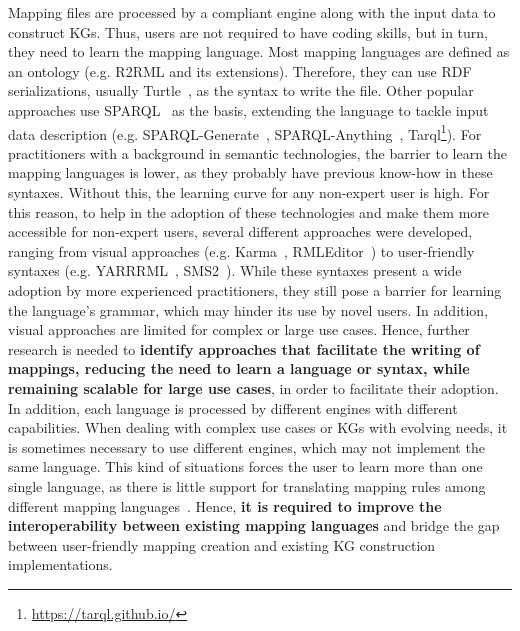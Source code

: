 

Mapping files are processed by a compliant engine along with the input data to construct KGs. 
Thus, users are not required to have coding skills, but in turn, they need to learn the mapping language. 
Most mapping languages are defined as an ontology (e.g. R2RML and its extensions). 
Therefore, they can use RDF serializations, usually Turtle~\parencite{turtle}, as the syntax to write the file.
Other popular approaches use SPARQL~\parencite{harris2013sparql} as the basis, extending the language to tackle input data description (e.g. SPARQL-Generate~\parencite{Lefrancois2017sparqlgenerate}, SPARQL-Anything~\parencite{asprino2023sparql-anything}, Tarql\footnote{\url{https://tarql.github.io/}}). 
For practitioners with a background in semantic technologies, the barrier to learn the mapping languages is lower, as they probably have previous know-how in these syntaxes. 
Without this, the learning curve for any non-expert user is high. 
For this reason, to help in the adoption of these technologies and make them more accessible for non-expert users, several different approaches were developed, ranging from visual approaches (e.g. Karma~\parencite{gupta2012karma}, RMLEditor~\parencite{heyvaert2016rmleditor}) to user-friendly syntaxes (e.g. YARRRML~\parencite{Heyvaert2018yarrrml}, SMS2~\parencite{sms2}). 
While these syntaxes present a wide adoption by more experienced practitioners, they still pose a barrier for learning the language's grammar, which may hinder its use by novel users. 
In addition, visual approaches are limited for complex or large use cases. 
Hence, further research is needed to \textbf{identify approaches that facilitate the writing of mappings, reducing the need to learn a language or syntax, while remaining scalable for large use cases}, in order to facilitate their adoption. 
In addition, each language is processed by different engines with different capabilities. When dealing with complex use cases or KGs with evolving needs, it is sometimes necessary to use different engines, which may not implement the same language. This kind of situations forces the user to learn more than one single language, as there is little support for translating mapping rules among different mapping languages~\parencite{corcho2020towards}. 
Hence, \textbf{it is required to improve the interoperability between existing mapping languages} and bridge the gap between user-friendly mapping creation and existing KG construction implementations. 


